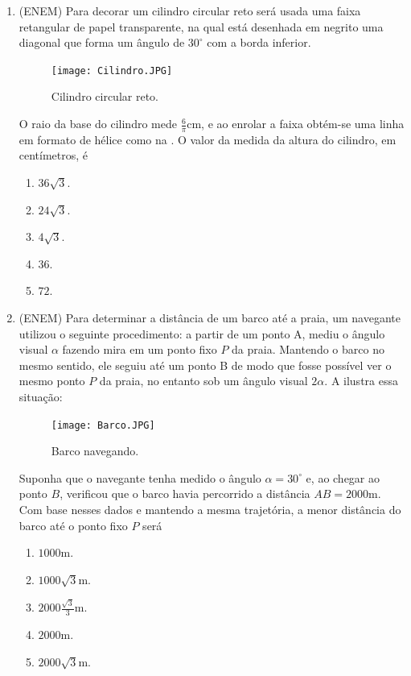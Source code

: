 \label{trigonometria-exercicios}
\begin{enumerate}

\item{}
(ENEM) Para decorar um cilindro circular reto será usada uma faixa retangular de papel transparente, na qual está desenhada em negrito uma diagonal que forma um ângulo de $30^\circ$ com a borda inferior.
\begin{figure}[H]
    \centering
    \texttt{[image: Cilindro.JPG]}
    \caption{Cilindro circular reto.}
    \label{Cilindro}
\end{figure}
O raio da base do cilindro mede $\frac{6}{\pi}$cm, e ao enrolar a faixa obtém-se uma linha em formato de hélice como na . O valor da medida da altura do cilindro, em centímetros, é
\begin{enumerate}
    \item $36\sqrt{3}$.
    \item $24\sqrt{3}$.
    \item $4\sqrt{3}$.
    \item $36$.
    \item $72$.
\end{enumerate} 

\item{}
(ENEM) Para determinar a distância de um barco até a praia, um navegante utilizou o seguinte procedimento: a partir de um ponto A, mediu o ângulo visual $\alpha$ fazendo mira em um ponto fixo $P$ da praia. Mantendo o barco no mesmo sentido, ele seguiu até um ponto B de modo que fosse possível ver o mesmo ponto $P$ da praia, no entanto sob um ângulo visual $2\alpha$. A  ilustra essa situação:
\begin{figure}[H]
    \centering
    \texttt{[image: Barco.JPG]}
    \caption{Barco navegando.}
    \label{Barco}
\end{figure}
Suponha que o navegante tenha medido o ângulo $\alpha= 30^\circ$ e, ao chegar ao ponto $B$, verificou que o barco havia percorrido a distância $AB = 2 000$m. Com base nesses dados e mantendo a mesma trajetória, a menor distância do barco até o ponto fixo $P$ será
\begin{enumerate}
    \item $1000$m.
    \item $1000\sqrt{3}$m.
    \item $2000\frac{\sqrt{3}}{3}$m.
    \item $2000$m.
    \item $2000\sqrt{3}$m.
\end{enumerate}


\end{enumerate}
